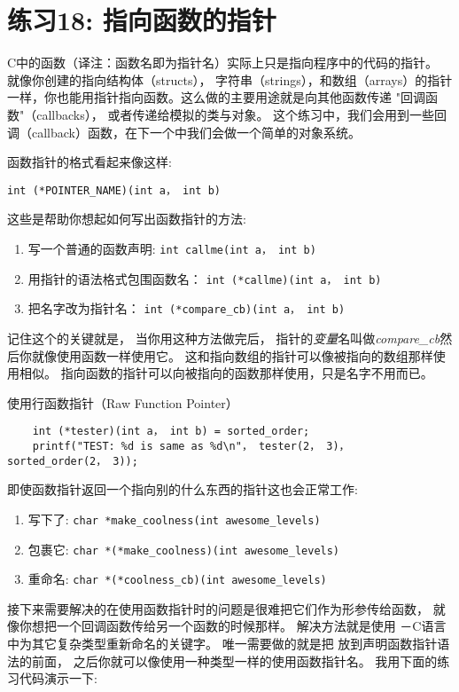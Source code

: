 \chapter{练习18: 指向函数的指针}

C中的函数（译注：函数名即为指针名）实际上只是指向程序中的代码的指针。 就像你创建的指向结构体（structs）， 字符串（strings），和数组（arrays）的指针一样，你也能用指针指向函数。这么做的主要用途就是向其他函数传递
"回调函数"（callbacks）， 或者传递给模拟的类与对象。 这个练习中，我们会用到一些回调（callback）函数，在下一个中我们会做一个简单的对象系统。

函数指针的格式看起来像这样:

\verb|int (*POINTER_NAME)(int a， int b)|

这些是帮助你想起如何写出函数指针的方法:

\begin{enumerate}
\item 写一个普通的函数声明: \verb|int callme(int a， int b)|
\item 用指针的语法格式包围函数名： \verb|int (*callme)(int a， int b)|
\item 把名字改为指针名： \verb|int (*compare_cb)(int a， int b)|
\end{enumerate}

记住这个的关键就是， 当你用这种方法做完后， 指针的\emph{变量}名叫做\emph{compare\_cb}然后你就像使用函数一样使用它。  这和指向数组的指针可以像被指向的数组那样使用相似。 指向函数的指针可以向被指向的函数那样使用，只是名字不用而已。

\begin{code}{使用行函数指针（Raw Function Pointer）}
\begin{lstlisting}
    int (*tester)(int a， int b) = sorted_order;
    printf("TEST: %d is same as %d\n"， tester(2， 3)， sorted_order(2， 3)); 
\end{lstlisting}
\end{code}

即使函数指针返回一个指向别的什么东西的指针这也会正常工作:

\begin{enumerate}
\item 写下了: \verb|char *make_coolness(int awesome_levels)|
\item 包裹它: \verb|char *(*make_coolness)(int awesome_levels)|
\item 重命名: \verb|char *(*coolness_cb)(int awesome_levels)|
\end{enumerate}

接下来需要解决的在使用函数指针时的问题是很难把它们作为形参传给函数， 就像你想把一个回调函数传给另一个函数的时候那样。 解决方法就是使用 －C语言中为其它复杂类型重新命名的关键字。
唯一需要做的就是把  放到声明函数指针语法的前面， 之后你就可以像使用一种类型一样的使用函数指针名。 我用下面的练习代码演示一下:

